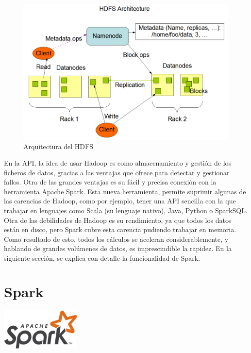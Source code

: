 \begin{figure}
	\centering
	\includegraphics[width=1\linewidth]{imagenes/hdfs_estructura}
	\caption{Arquitectura del HDFS \cite{HadoopHDFS}}
	\label{fig:hdfsestructura}
\end{figure}

En la API, la idea de usar Hadoop es como almacenamiento y gestión de los ficheros de datos, gracias a las ventajas que ofrece para detectar y gestionar fallos. Otra de las grandes ventajas es su fácil y precisa conexión con la herramienta Apache Spark. Esta nueva herramienta, permite suprimir algunas de las carencias de Hadoop, como por ejemplo, tener una API sencilla con la que trabajar en lenguajes como Scala (su lenguaje nativo), Java, Python o SparkSQL. Otra de las debilidades de Hadoop es su rendimiento, ya que todos los datos están en disco, pero Spark cubre esta carencia pudiendo trabajar en memoria. Como resultado de esto, todos los cálculos se aceleran considerablemente, y hablando de grandes volúmenes de datos, es imprescindible la rapidez. 
En la siguiente sección, se explica con detalle la funcionalidad de Spark.

\section{Spark}

\begin{minipage}{\textwidth}
	\centering
	\includegraphics[width=0.3\textwidth]{imagenes/spark_logo.png}\\[0.1cm]
\end{minipage}

